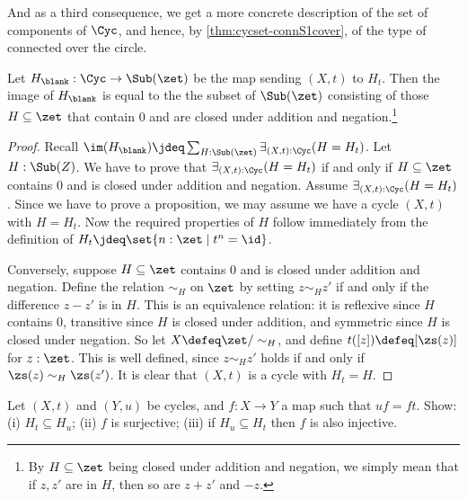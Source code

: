 And as a third consequence,
we get a more concrete description of the set of components of $\Cyc$,
and hence, by \cref{thm:cycset-connS1cover},
of the type of connected \coverings over the circle.
\begin{corollary}\label{cor:set-trunc-cyc}
  Let $H_\blank : \Cyc \to \Sub(\zet)$ be the map sending $(X,t)$ to $H_t$.
  Then the image of $H_\blank$ is equal to the
  the subset of $\Sub(\zet)$ consisting of those
  $H\subseteq\zet$ that contain $0$ and are closed
  under addition and negation.\footnote{%
    By $H\subseteq \zet$ being closed under addition and negation,
    we simply mean that if $z,z'$ are in $H$,
    then so are $z+z'$ and $-z$.}
\end{corollary}
\begin{proof}
  Recall $\im(H_\blank)\jdeq\sum_{H:\Sub(\zet)}\exists_{(X,t):\Cyc}(H=H_t)$.
  Let $H:\Sub(Z)$.
  We have to prove that $\exists_{(X,t):\Cyc}(H=H_t)$
  if and only if $H\subseteq\zet$ contains $0$ and
  is closed under addition and negation.
  Assume $\exists_{(X,t):\Cyc}(H=H_t)$.
  Since we have to prove a proposition,
  we may assume we have a cycle $(X,t)$ with
  $H=H_t$. Now the required properties of $H$ follow immediately from
  the definition of $H_t\jdeq\set{n:\zet \mid t^n = \id}$.

  Conversely, suppose $H \subseteq \zet$ contains $0$ and
  is closed under addition and negation.
  Define the relation $\sim_H$ on $\zet$ by setting $z \sim_H z'$
  if and only if the difference $z-z'$ is in $H$.
  This is an equivalence relation:
  it is reflexive since $H$ contains $0$,
  transitive since $H$ is closed under addition,
  and symmetric since $H$ is closed under negation.
  So let $X \defeq \zet/\sim_H$, and define $t([z])\defeq[\zs(z)]$
  for $z:\zet$.
  This is well defined, since $z \sim_H z'$ holds if and only if
  $\zs(z) \sim_H \zs(z')$.
  It is clear that $(X,t)$ is a cycle with $H_t = H$.
\end{proof}

\begin{xca}\label{xca:map-of-cycles}
Let $(X,t)$ and $(Y,u)$ be cycles, and $f:X\to Y$ a map such that $uf=ft$.
Show: (i) $H_t \subseteq H_u$; (ii) $f$ is surjective; (iii)
if $H_u \subseteq H_t$ then $f$ is also injective.
\end{xca}

